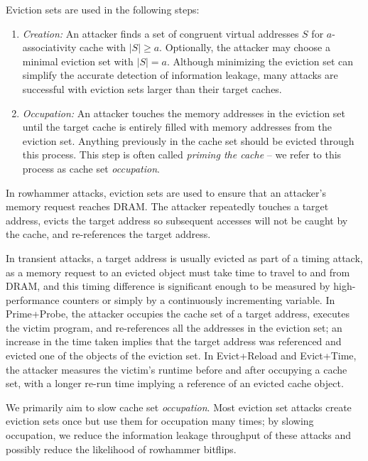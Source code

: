 
Eviction sets are used in the following steps:

\begin{enumerate}
    \item \textit{Creation:} An attacker finds a set of congruent virtual addresses $S$ for $a$-associativity cache with $|S| \geq a$. Optionally, the attacker may choose a minimal eviction set with $|S|=a$.
    Although minimizing the eviction set can simplify the accurate detection of information leakage,
    many attacks are successful with eviction sets larger than their target caches.

    \item \textit{Occupation:} An attacker touches the memory addresses in the eviction set until the target cache is entirely filled with memory addresses from the eviction set.
    Anything previously in the cache set should be evicted through this process.
    This step is often called \textit{priming the cache} – we refer to this process as cache set \textit{occupation}.
\end{enumerate}

In rowhammer attacks, eviction sets are used to ensure that an attacker's memory request reaches DRAM.
The attacker repeatedly touches a target address, evicts the target address so subsequent accesses will not be caught by the cache,
and re-references the target address.

In transient attacks, a target address is usually evicted as part of a timing attack, as a memory request to an evicted object
must take time to travel to and from DRAM, and this timing difference is significant enough to be measured
by high-performance counters or simply by a continuously incrementing variable.
In Prime+Probe, the attacker occupies the cache set of a target address, executes the victim program, and re-references
all the addresses in the eviction set; an increase in the time taken implies that the target address was referenced and evicted
one of the objects of the eviction set.
In Evict+Reload and Evict+Time, the attacker measures the victim's runtime before and after occupying a cache set,
with a longer re-run time implying a reference of an evicted cache object.

We primarily aim to slow cache set \textit{occupation}.
Most eviction set attacks create eviction sets once but use them for occupation many times;
by slowing occupation, we reduce the information leakage throughput of these attacks
and possibly reduce the likelihood of rowhammer bitflips.

